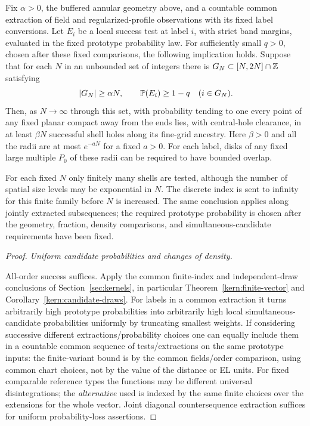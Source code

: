 \begin{proposition}\label{conf:aligned-shells}

Fix \(\alpha>0\), the buffered annular geometry above, and a
countable common extraction of field and regularized-profile observations
with its fixed label conversions. Let \(E_i\) be a local success test at
label \(i\), with strict band margins, evaluated in the fixed prototype
probability law. For sufficiently small \(q>0\), chosen after these
fixed comparisons, the following implication holds. Suppose that for
each \(N\) in an unbounded set of integers there is
\(G_N\subset[N,2N]\cap\mathbb Z\) satisfying
\[
 |G_N|\ge\alpha N,
 \qquad \mathbb P(E_i)\ge1-q\quad(i\in G_N).
\]
Then, as \(N\to\infty\) through this set, with probability tending to
one every point of any fixed planar compact away from the ends lies,
with central-hole clearance, in at least \(\beta N\) successful shell
holes along its fine-grid ancestry. Here \(\beta>0\) and all the radii
are at most \(e^{-aN}\) for a fixed \(a>0\). For each label, disks of
any fixed large multiple \(P_0\) of these radii can be required to have
bounded overlap.

For each fixed \(N\) only finitely many shells are tested, although the
number of spatial size levels may be exponential in \(N\). The discrete
index is sent to infinity for this finite family before \(N\) is
increased. The same conclusion applies along jointly extracted
subsequences; the required prototype probability is chosen after the
geometry, fraction, density comparisons, and simultaneous-candidate
requirements have been fixed.

\end{proposition}\begin{proof}

\smallskip\noindent\emph{Uniform candidate probabilities and changes of density.}\par

All-order success suffices. Apply the common finite-index and independent-draw conclusions of
Section~\ref{sec:kernels}, in particular Theorem~\ref{kern:finite-vector} and
Corollary~\ref{kern:candidate-draws}. For labels in a common extraction it turns arbitrarily high
prototype probabilities into arbitrarily high local simultaneous-candidate probabilities uniformly
by truncating smallest weights. If considering successive different extractions/probability choices
one can equally include them in a countable common sequence of tests/extractions on the same
prototype inputs: the finite-variant bound is by the common fields/order comparison, using common
chart choices, not by the value of the distance or EL units. For fixed comparable reference types
the functions may be different universal disintegrations; the \emph{alternative} used is indexed by
the same finite choices over the extensions for the whole vector. Joint diagonal countersequence
extraction suffices for uniform probability-loss assertions.


\end{proof}
